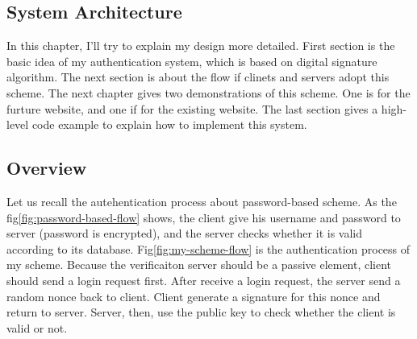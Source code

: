 \begin{CJK}{Bg5}{bsmi}


\chapter{System Architecture}

In this chapter, I'll try to explain my design more detailed. First section is the basic idea of my authentication system, which is based on digital signature algorithm. The next section is about the flow if clinets and servers adopt this scheme. The next chapter gives two demonstrations of this scheme. One is for the furture website, and one if for the existing website. The last section gives a high-level code example to explain how to implement this system.

\section{Overview}

Let us recall the autehentication process about password-based scheme. As the fig\ref{fig:password-based-flow} shows, the client give his username and password to server (password is encrypted), and the server checks whether it is valid according to its database. Fig\ref{fig:my-scheme-flow} is the authentication process of my scheme. Because the verificaiton server should be a passive element, client should send a login request first. After receive a login request, the server send a random nonce back to client. Client generate a signature for this nonce and return to server. Server, then, use the public key to check whether the client is valid or not.


\end{CJK}
